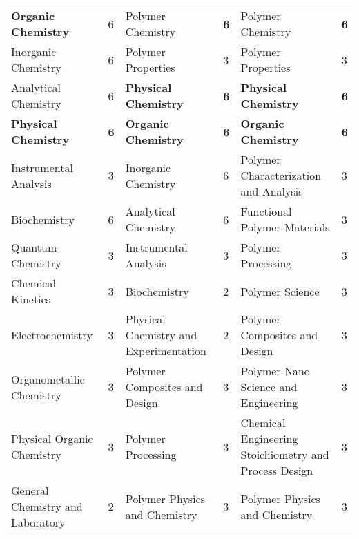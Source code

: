 \documentclass{bmcart}
\begin{document}
\begin{landscape}
\begin{longtable}{p{3.5cm}|p{1cm}|p{7cm}|p{1cm}|p{7cm}|p{1cm}}
\scriptsize
\scriptsize \textbf{Organic Chemistry} & \scriptsize 6 & \scriptsize Polymer Chemistry & \scriptsize \textbf{6} & \scriptsize Polymer Chemistry & \scriptsize \textbf{6} \\
\scriptsize Inorganic Chemistry & \scriptsize 6 & \scriptsize Polymer Properties & \scriptsize 3 & \scriptsize Polymer Properties & \scriptsize 3 \\
\scriptsize Analytical Chemistry & \scriptsize 6 & \scriptsize \textbf{Physical Chemistry} & \scriptsize \textbf{6} & \scriptsize \textbf{Physical Chemistry} & \scriptsize \textbf{6} \\
\scriptsize \textbf{Physical Chemistry} & \scriptsize \textbf{6} & \scriptsize \textbf{Organic Chemistry} & \scriptsize \textbf{6} & \scriptsize \textbf{Organic Chemistry} & \scriptsize \textbf{6} \\
\scriptsize Instrumental Analysis & \scriptsize 3 & \scriptsize Inorganic Chemistry & \scriptsize 6 & \scriptsize Polymer Characterization and Analysis & \scriptsize 3 \\
\scriptsize Biochemistry & \scriptsize 6 & \scriptsize Analytical Chemistry & \scriptsize 6 & \scriptsize Functional Polymer Materials & \scriptsize 3 \\
\scriptsize Quantum Chemistry & \scriptsize 3 & \scriptsize Instrumental Analysis & \scriptsize 3 & \scriptsize Polymer Processing & \scriptsize 3 \\
\scriptsize Chemical Kinetics & \scriptsize 3 & \scriptsize Biochemistry & \scriptsize 2 & \scriptsize Polymer Science & \scriptsize 3 \\
\scriptsize Electrochemistry & \scriptsize 3 & \scriptsize Physical Chemistry \newline and Experimentation & \scriptsize 2 & \scriptsize Polymer Composites and Design & \scriptsize 3 \\
\scriptsize Organometallic Chemistry & \scriptsize 3 & \scriptsize Polymer Composites and Design & \scriptsize 3 & \scriptsize Polymer Nano Science and Engineering & \scriptsize 3 \\
\scriptsize Physical Organic Chemistry & \scriptsize 3 & \scriptsize Polymer Processing & \scriptsize 3 & \scriptsize Chemical Engineering Stoichiometry and Process Design & \scriptsize 3 \\
\scriptsize General Chemistry \newline and Laboratory & \scriptsize 2 & \scriptsize Polymer Physics and Chemistry & \scriptsize 3 & \scriptsize Polymer Physics and Chemistry & \scriptsize 3 \\

\end{longtable}
\end{landscape}
\end{document}
